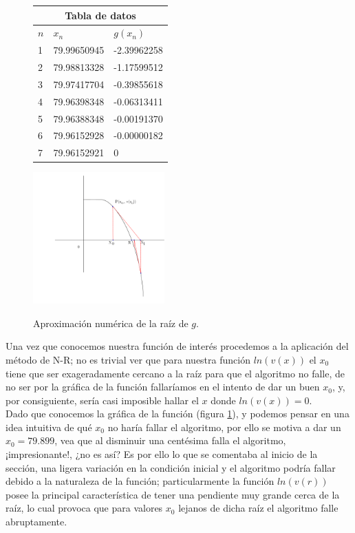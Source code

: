 \begin{figure}
\centering
\begin{tabular}{|| p{2cm} | p{2cm} | p{2cm} ||}
    \hline
    \multicolumn{3}{|c|}{Tabla de datos}\\
    \hline
    \hline
    $n$ & $x_n$ & $g(x_n)$ \\
    \hline
    1 & 79.99650945 &-2.39962258  \\
    \hline
    2 & 79.98813328 & -1.17599512 \\
    \hline
    3 & 79.97417704 & -0.39855618 \\
    \hline
    4 & 79.96398348 & -0.06313411 \\
    \hline
    5 & 79.96388348 & -0.00191370 \\
    \hline
    6 & 79.96152928 & -0.00000182 \\
    \hline
    7 & 79.96152921 & 0 \\
    \hline
    \hline
\end{tabular}
\caption{Aproximación numérica de la raíz de $g.$}
\label{DFA_table}
\includegraphics[width=0.45\textwidth]{capitulos/graficas/newto.pdf}\label{fig:graphic_NEWTO}
\end{figure}

Una vez que conocemos nuestra función de interés procedemos a la aplicación del método de N-R; no es trivial ver que para nuestra función $ln(v(x))$ el $x_0$ tiene que ser exageradamente cercano a la raíz para que el algoritmo no falle, de no ser por la gráfica de la función fallaríamos en el intento de dar un buen $x_0$, y, por consiguiente, sería casi imposible hallar el $x$ donde $ln(v(x))=0$.\\
Dado que conocemos la gráfica de la función (figura \ref{fig:graphic_NEWTO}), y podemos pensar en una idea intuitiva de qué $x_0$ no haría fallar el algoritmo, por ello se motiva a dar un $x_0=79.899$, vea que al disminuir una centésima falla el algoritmo, ¡impresionante!, ¿no es así? Es por ello lo que se comentaba al inicio de la sección, una ligera variación en la condición inicial y el algoritmo podría fallar debido a la naturaleza de la función; particularmente la función $ln(v(r))$ posee la principal característica de tener una pendiente muy grande cerca de la raíz, lo cual provoca que para valores $x_0$ lejanos de dicha raíz el algoritmo falle abruptamente.

